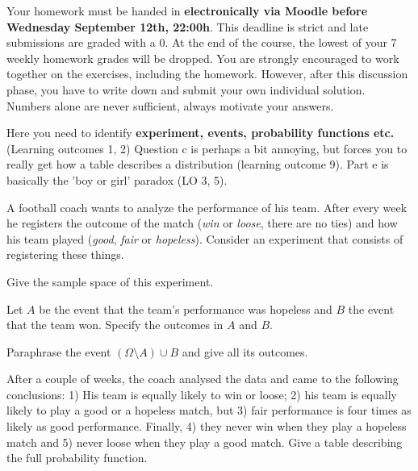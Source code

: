 \documentclass[a4paper,10pt,landscape,twocolumn]{scrartcl}
\newcommand\deadline{Wednesday September 12th, 22:00h}
\begin{document}
\homeworkproblems

{\sffamily\noindent
Your homework must be handed in \textbf{electronically via Moodle before \deadline}. This deadline is strict and late submissions are graded with a 0. At the end of the course, the lowest of your 7 weekly homework grades will be dropped. You are strongly encouraged to work together on the exercises, including the homework. However, after this discussion phase, you have to write down and submit your own individual solution. Numbers alone are never sufficient, always motivate your answers.
}



\begin{exercise}[Hospitals (4pt)]
	\begin{mycomment}
	Here you need to identify \textbf{experiment, events, probability functions etc.} (Learning outcomes 1, 2) Question c is perhaps a bit annoying, but forces you to really get how a table describes a distribution (learning outcome 9). Part e is basically the 'boy or girl' paradox (LO 3, 5). 
	\end{mycomment}
	
	 A football coach wants to analyze the performance of his team. After every week he registers the outcome of the match (\emph{win} or \emph{loose}, there are no ties) and how his team played (\emph{good}, \emph{fair} or \emph{hopeless}). Consider an experiment that consists of registering these things.
	
	\begin{subex}[0.5pt]
		Give the sample space of this experiment.	
	\end{subex}
	
	\begin{subex}[0.5pt]
		Let $A$ be the event that the team's performance was hopeless and $B$ the event that the team won. Specify the outcomes in $A$ and $B$.
	\end{subex}

	\begin{subex}[1pt]
		Paraphrase the event $(\Omega \setminus A) \cup B$ and give all its outcomes.	
	\end{subex}
	
	\begin{subex}[1pt]
	After a couple of weeks, the coach analysed the data and came to the following conclusions: 1) His team is equally likely to win or loose; 2) his team is equally likely to play a good or a hopeless match, but 3)  fair performance is four times as likely as good performance. Finally, 4) they never win when they play a hopeless match and 5) never loose when they play a good match. Give a table describing the full probability function.
	\end{subex}


\end{exercise}
\end{document}
